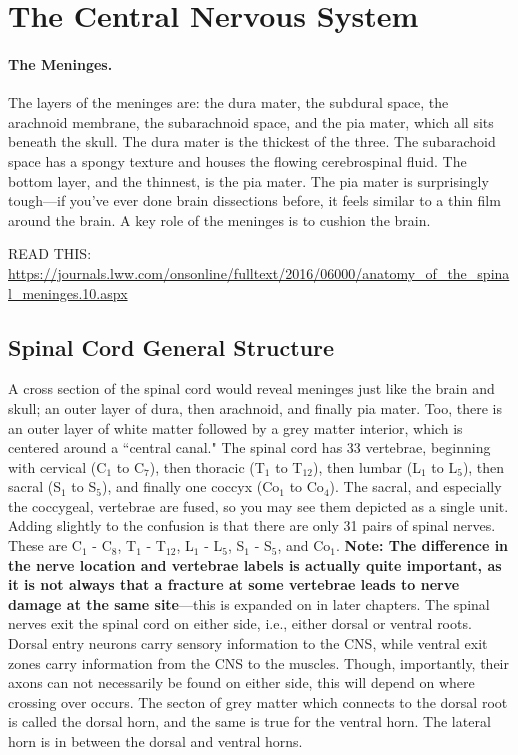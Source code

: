 \chapter{The Central Nervous System}

\subsubsection{The Meninges.}

The layers of the meninges are: the dura mater, the subdural space, the arachnoid membrane, the subarachnoid space, and the pia mater, which all sits beneath the skull. The dura mater is the thickest of the three. The subarachoid space has a spongy texture and houses the flowing cerebrospinal fluid. The bottom layer, and the thinnest, is the pia mater. The pia mater is surprisingly tough---if you've ever done brain dissections before, it feels similar to a thin film around the brain. A key role of the meninges is to cushion the brain.\newline

READ THIS: \url{https://journals.lww.com/onsonline/fulltext/2016/06000/anatomy_of_the_spinal_meninges.10.aspx}

\section{Spinal Cord General Structure}
A cross section of the spinal cord would reveal meninges just like the brain and skull; an outer layer of dura, then arachnoid, and finally pia mater. Too, there is an outer layer of white matter followed by a grey matter interior, which is centered around a ``central canal." The spinal cord has 33 vertebrae, beginning with cervical (C$_1$ to C$_7$), then thoracic (T$_1$ to T$_{12}$), then lumbar (L$_1$ to L$_5$), then sacral (S$_1$ to S$_5$), and finally one coccyx (Co$_1$ to Co$_4$). The sacral, and especially the coccygeal, vertebrae are fused, so you may see them depicted as a single unit. Adding slightly to the confusion is that there are only 31 pairs of spinal nerves. These are C$_1$ - C$_8$, T$_1$ - T$_{12}$, L$_1$ - L$_5$, S$_1$ - S$_5$, and Co$_1$. \textbf{Note: The difference in the nerve location and vertebrae labels is actually quite important, as it is not always that a fracture at some vertebrae leads to nerve damage at the same site}---this is expanded on in later chapters. The spinal nerves exit the spinal cord on either side, i.e., either dorsal or ventral roots. Dorsal entry neurons carry sensory information to the CNS, while ventral exit zones carry information from the CNS to the muscles. Though, importantly, their axons can not necessarily be found on either side, this will depend on where crossing over occurs. The secton of grey matter which connects to the dorsal root is called the dorsal horn, and the same is true for the ventral horn. The lateral horn is in between the dorsal and ventral horns.\newline


